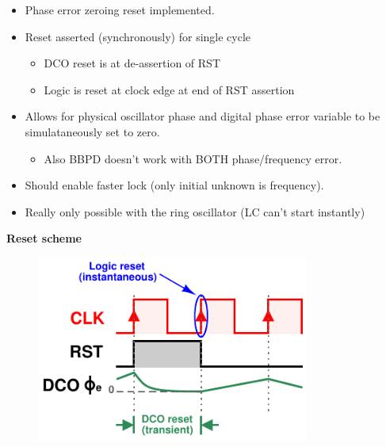 			\begin{itemize}[itemsep=4pt,label=\protect---]
			        \item Phase error zeroing reset implemented.
			        \item Reset asserted (synchronously) for single cycle 
					\begin{itemize}[itemsep=4pt,label=$\bullet$]
						\item DCO reset is at de-assertion of RST
						\item Logic is reset at clock edge at end of RST assertion
					\end{itemize}
					\item Allows for physical oscillator phase and digital phase error variable to be simulataneously set to zero.
					\begin{itemize}[itemsep=4pt,label=$\bullet$]
						\item Also BBPD doesn't work with BOTH phase/frequency error.
					\end{itemize}
					\item Should enable faster lock (only initial unknown is frequency).
					\item Really only possible with the ring oscillator (LC can't start instantly)
			\end{itemize}

			\textbf{\hspace{3em}Reset scheme}
			\begin{figure}[htb!]
			        \centering
			        \includegraphics[width=0.8\textwidth, angle=0]{./figs/pll_reset}
			\end{figure}



